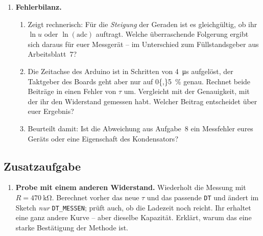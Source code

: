 \documentclass[a4paper,12pt]{scrartcl}
\begin{document}
\begin{enumerate}[leftmargin=2em, resume, itemsep=13pt, topsep=9pt]
\item \textbf{Fehlerbilanz.}
  \begin{enumerate}[label=(\alph*), leftmargin=2em, itemsep=7pt, topsep=6pt]
  \item Zeigt rechnerisch: Für die \emph{Steigung} der Geraden ist es gleichgültig, ob ihr $\ln u$
        oder $\ln(\text{adc})$ auftragt. Welche überraschende Folgerung ergibt sich daraus für euer
        Messgerät -- im Unterschied zum Füllstandsgeber aus Arbeitsblatt~7?
  \item Die Zeitachse des Arduino ist in Schritten von \SI{4}{\micro\second} aufgelöst, der
        Taktgeber des Boards geht aber nur auf \SI{0{,}5}{\percent} genau. Rechnet beide Beiträge
        in einen Fehler von $\tau$ um. Vergleicht mit der Genauigkeit, mit der ihr den Widerstand
        gemessen habt. Welcher Beitrag entscheidet über euer Ergebnis?
  \item Beurteilt damit: Ist die Abweichung aus Aufgabe~8 ein Messfehler eures Geräts oder eine
        Eigenschaft des Kondensators?
  \end{enumerate}
\end{enumerate}

\subsection*{Zusatzaufgabe}

\begin{enumerate}[leftmargin=2em, resume, itemsep=11pt, topsep=9pt]
\item \textbf{Probe mit einem anderen Widerstand.} Wiederholt die Messung mit
$R=\SI{470}{\kilo\ohm}$. Berechnet vorher das neue $\tau$ und das passende \texttt{DT} und ändert
im Sketch \emph{nur} \texttt{DT\_MESSEN}; prüft auch, ob die Ladezeit noch reicht. Ihr erhaltet eine
ganz andere Kurve -- aber dieselbe Kapazität. Erklärt, warum das eine starke Bestätigung der
Methode ist.
\end{enumerate}
\end{document}
